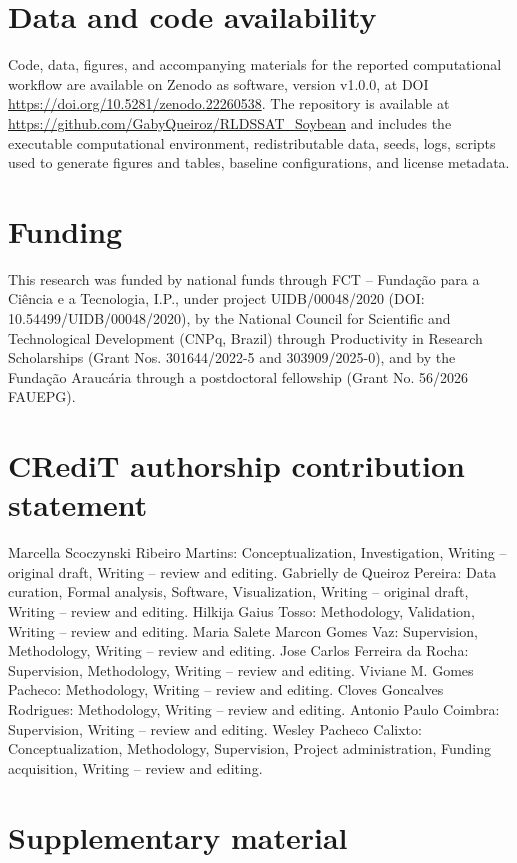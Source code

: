 \documentclass[times,final,authoryear]{elsarticle}
\begin{document}
\section*{Data and code availability}

Code, data, figures, and accompanying materials for the reported computational workflow are available on Zenodo as software, version v1.0.0, at DOI \url{https://doi.org/10.5281/zenodo.22260538}. The repository is available at \url{https://github.com/GabyQueiroz/RLDSSAT_Soybean} and includes the executable computational environment, redistributable data, seeds, logs, scripts used to generate figures and tables, baseline configurations, and license metadata.

\section*{Funding}
This research was funded by national funds through FCT – Fundação para a Ciência e a Tecnologia, I.P., under project UIDB/00048/2020 (DOI: 10.54499/UIDB/00048/2020), by the National Council for Scientific and Technological Development (CNPq, Brazil) through Productivity in Research Scholarships (Grant Nos. 301644/2022-5 and 303909/2025-0), and by the Fundação Araucária through a postdoctoral fellowship (Grant No. 56/2026 FAUEPG).

\section*{CRediT authorship contribution statement}

Marcella Scoczynski Ribeiro Martins: Conceptualization, Investigation, Writing -- original draft, Writing -- review and editing. Gabrielly de Queiroz Pereira: Data curation, Formal analysis, Software, Visualization, Writing -- original draft, Writing -- review and editing. Hilkija Gaius Tosso: Methodology, Validation, Writing -- review and editing. Maria Salete Marcon Gomes Vaz: Supervision, Methodology, Writing -- review and editing. Jose Carlos Ferreira da Rocha: Supervision, Methodology, Writing -- review and editing. Viviane M. Gomes Pacheco: Methodology, Writing -- review and editing. Cloves Goncalves Rodrigues: Methodology, Writing -- review and editing. Antonio Paulo Coimbra: Supervision, Writing -- review and editing. Wesley Pacheco Calixto: Conceptualization, Methodology, Supervision, Project administration, Funding acquisition, Writing -- review and editing.

\section*{Supplementary material}
\end{document}
